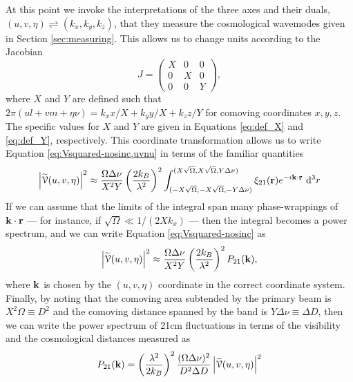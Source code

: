 At this point we invoke the interpretations of the three axes and their duals, $(u,v,\eta)
\rightleftharpoons (k_x,k_y,k_z)$, that they measure the cosmological wavemodes given in Section
\ref{sec:measuring}. This allows us to change units according to the Jacobian
\begin{equation}
  J = \begin{pmatrix}
      X&0&0\\0&X&0\\0&0&Y
  \end{pmatrix}
  \label{eq:lmnu_jacobian},
\end{equation}
where $X$ and $Y$ are defined such that $2\pi(ul+vm+\eta\nu) = k_xx/X+k_yy/X+k_zz/Y$ for comoving
coordinates $x,y,z$. The specific values for $X$ and $Y$ are given in Equations \ref{eq:def_X} and
\ref{eq:def_Y}, respectively. This coordinate transformation allows us to write Equation
\ref{eq:Vsquared-nosinc,uvnu} in terms of the familiar quantities
\begin{equation}
  \left|\widetilde{\mathcal{V}}(u,v,\eta)\right|^2 
  \approx 
  \frac{\Omega\Delta\nu}{X^2Y}
  \left(\frac{2k_B}{\lambda^2}\right)^2
  \int^{(X\sqrt{\Omega},X\sqrt{\Omega},Y\Delta\nu)}_{(-X\sqrt{\Omega},-X\sqrt{\Omega},-Y\Delta\nu)}
  \xi_{21}(\mathbf{r})
  e^{-i\mathbf{k}\cdot\mathbf{r}}
  \ \mathrm{d}^3r
  \label{eq:Vsquared-nosinc}
\end{equation}
If we can assume that the limits of the integral span many phase-wrappings of $\mathbf{k}\cdot\mathbf{r}$
--- for instance, if $\sqrt{\Omega} \ll 1/(2Xk_x)$ --- then the integral becomes a power spectrum,
and we can write Equation \ref{eq:Vsquared-nosinc} as 
\begin{equation}
  \left|\widetilde{\mathcal{V}}(u,v,\eta)\right|^2 
  \approx 
  \frac{\Omega\Delta\nu}{X^2Y}
  \left(\frac{2k_B}{\lambda^2}\right)^2
  P_{21}(\mathbf{k}),
  \label{eq:Vsquared}
\end{equation}
where $\mathbf{k}$ is chosen by the $(u,v,\eta)$ coordinate in the correct coordinate system. Finally, by
noting that the comoving area subtended by the primary beam is $X^2\Omega \equiv D^2$ and the
comoving distance spanned by the band is $Y\Delta\nu \equiv \Delta D$, then we can write the power
spectrum of 21cm fluctuations in terms of the visibility and the cosmological distances measured as 
\begin{equation}
  P_{21}(\mathbf{k}) = 
    \left(\frac{\lambda^2}{2k_B}\right)^2
    \frac{(\Omega\Delta\nu)^2}{D^2\Delta D}
    \left|\widetilde{\mathcal{V}}(u,v,\eta)\right|^2
  \label{eq:def_vis2pk}
\end{equation}
